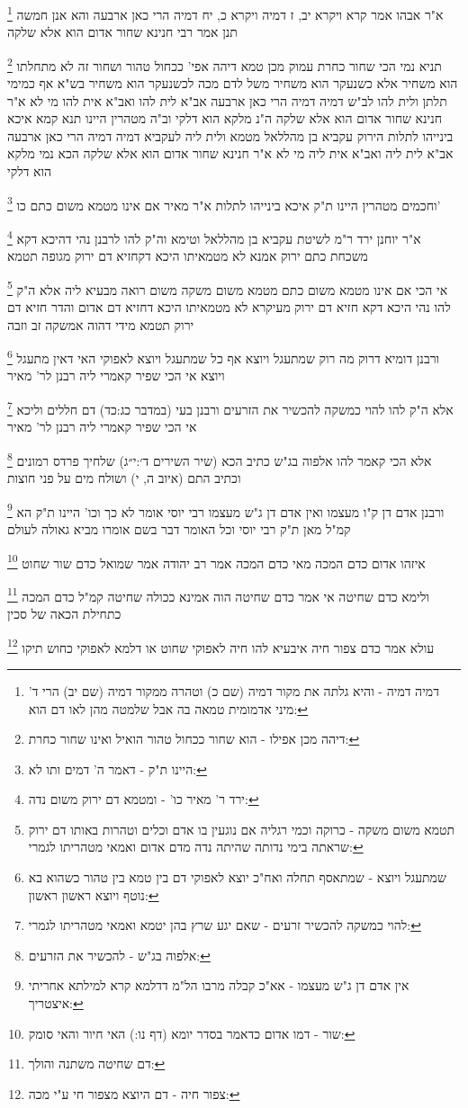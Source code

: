\documentclass[12pt, openany]{book}
\newcommand{\footnotecomment}[1]{
	\renewcommand\thefootnote{}
	\footnote{#1}}
\newcommand{\commenta}[1]{\footnotecomment{#1}}
\begin{document}
{{\commenta{דמיה דמיה - והיא גלתה את מקור דמיה (שם כ) וטהרה ממקור דמיה (שם יב) הרי ד' מיני אדמומית טמאה בה אבל שלמטה מהן לאו דם הוא:}
א"ר אבהו אמר קרא {ויקרא יב, ז} דמיה {ויקרא כ, יח} דמיה הרי כאן ארבעה 
והא אנן חמשה תנן אמר רבי חנינא שחור אדום הוא אלא שלקה 
\commenta{דיהה מכן אפילו - הוא שחור ככחול טהור הואיל ואינו שחור כחרת:}
תניא נמי הכי שחור כחרת עמוק מכן טמא דיהה אפי' ככחול טהור ושחור זה לא מתחלתו הוא משחיר אלא כשנעקר הוא משחיר משל לדם מכה לכשנעקר הוא משחיר
בש"א אף כמימי תלתן ולית להו לב"ש דמיה דמיה הרי כאן ארבעה 
אב"א לית להו ואב"א אית להו מי לא א"ר חנינא שחור אדום הוא אלא שלקה ה"נ מלקא הוא דלקי
וב"ה מטהרין היינו תנא קמא 
איכא בינייהו
לתלות 
הירוק עקביא בן מהללאל מטמא ולית ליה לעקביא דמיה דמיה הרי כאן ארבעה 
אב"א לית ליה ואב"א אית ליה מי לא א"ר חנינא שחור אדום הוא אלא שלקה הכא נמי מלקא הוא דלקי
\commenta{היינו ת"ק - דאמר ה' דמים ותו לא:}
וחכמים מטהרין היינו ת"ק איכא בינייהו לתלות
א"ר מאיר אם אינו מטמא משום כתם כו'
\commenta{ירד ר' מאיר כו' - ומטמא דם ירוק משום נדה:}
א"ר יוחנן ירד ר"מ לשיטת עקביא בן מהללאל וטימא וה"ק להו לרבנן נהי דהיכא דקא משכחת כתם ירוק אמנא לא מטמאיתו היכא דקחזיא דם ירוק מגופה תטמא 
\commenta{תטמא משום משקה - כרוקה וכמי רגליה אם נוגעין בו אדם וכלים וטהרות באותו דם ירוק שראתה בימי נדותה שהיתה נדה מדם אדום ואמאי מטהריתו לגמרי:}
אי הכי אם אינו מטמא משום כתם מטמא משום משקה משום רואה מבעיא ליה 
אלא ה"ק להו נהי היכא דקא חזיא דם ירוק מעיקרא לא מטמאיתו היכא דחזיא דם אדום והדר חזיא דם ירוק תטמא מידי דהוה אמשקה זב וזבה 
\commenta{שמתעגל ויוצא - שמתאסף תחלה ואח"כ יוצא לאפוקי דם בין טמא בין טהור כשהוא בא נוטף ויוצא ראשון ראשון:}
ורבנן דומיא דרוק מה רוק שמתעגל ויוצא אף כל שמתעגל ויוצא לאפוקי האי דאין מתעגל ויוצא אי הכי שפיר קאמרי ליה רבנן לר' מאיר 
\commenta{להוי כמשקה להכשיר זרעים - שאם יגע שרץ בהן יטמא ואמאי מטהריתו לגמרי:}
אלא ה"ק להו להוי כמשקה להכשיר את הזרעים ורבנן בעי (במדבר כג:כד) דם חללים וליכא אי הכי שפיר קאמרי ליה רבנן לר' מאיר 
\commenta{אלפוה בג"ש - להכשיר את הזרעים:}
אלא הכי קאמר להו אלפוה בג"ש כתיב הכא (שיר השירים ד׳:י״ג) שלחיך פרדס רמונים וכתיב התם (איוב ה, י) ושולח מים על פני חוצות 
\commenta{אין אדם דן ג"ש מעצמו - אא"כ קבלה מרבו הל"מ דדלמא קרא למילתא אחריתי איצטריך:}
ורבנן אדם דן ק"ו מעצמו ואין אדם דן ג"ש מעצמו
רבי יוסי אומר לא כך וכו' היינו ת"ק הא קמ"ל מאן ת"ק רבי יוסי וכל האומר דבר בשם אומרו מביא גאולה לעולם
\commenta{שור - דמו אדום כדאמר בסדר יומא (דף נו:) האי חיור והאי סומק: }
איזהו אדום כדם המכה מאי כדם המכה אמר רב יהודה אמר שמואל כדם שור שחוט 
\commenta{דם שחיטה משתנה והולך:}
ולימא כדם שחיטה אי אמר כדם שחיטה הוה אמינא ככולה שחיטה קמ"ל כדם המכה כתחילת הכאה של סכין 
\commenta{צפור חיה - דם היוצא מצפור חי ע"י מכה:}
עולא אמר כדם צפור חיה איבעיא להו חיה לאפוקי שחוט או דלמא לאפוקי כחוש תיקו 
}}
\end{document}
